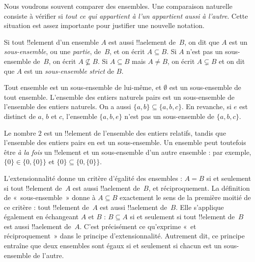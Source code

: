 \documentclass[../../../include/open-logic-section]{subfiles}
\begin{document}

\begin{explain}
Nous voudrons souvent comparer des ensembles. Une comparaison
naturelle consiste à vérifier si \emph{tout ce qui appartient à
l'un appartient aussi à l'autre}. Cette situation est assez
importante pour justifier une nouvelle notation.
\end{explain}

\begin{defn}
Si tout !!{element} d'un ensemble $A$ est aussi !!a{element} de~$B$,
on dit que $A$ est un \emph{sous-ensemble}, ou une \emph{partie},
de~$B$, et on écrit $A \subseteq B$. Si $A$ n'est pas un
sous-ensemble de~$B$, on écrit $A \not\subseteq B$.
Si $A \subseteq B$ mais $A \neq B$, on écrit $A \subsetneq B$
et on dit que $A$ est un \emph{sous-ensemble strict} de $B$.
\end{defn}

\begin{ex}
Tout ensemble est un sous-ensemble de lui-même, et $\emptyset$ est
un sous-ensemble de tout ensemble. L'ensemble des entiers naturels
pairs est un sous-ensemble de l'ensemble des entiers naturels.
On a aussi $\{ a, b \} \subseteq \{ a, b, c \}$. En revanche,
si $e$ est distinct de $a$, $b$ et $c$, l'ensemble $\{ a, b, e \}$
n'est pas un sous-ensemble de $\{ a, b, c \}$.
%
\end{ex}

\begin{ex}
Le nombre $2$ est un !!{element} de l'ensemble des entiers relatifs,
tandis que l'ensemble des entiers pairs en est un sous-ensemble.
Un ensemble peut toutefois être \emph{à la fois} un !!{element}
et un sous-ensemble d'un autre ensemble : par exemple,
$\{0\} \in \{0, \{0\}\}$ et $\{0\} \subseteq \{0, \{0\}\}$.
\end{ex}

L'extensionnalité donne un critère d'égalité des ensembles :
$A = B$ si et seulement si tout !!{element} de~$A$ est aussi
!!a{element} de~$B$, et réciproquement. La définition de
«~sous-ensemble~» donne à $A \subseteq B$ exactement le sens de
la première moitié de ce critère : tout !!{element} de~$A$ est
aussi !!a{element} de~$B$. Elle s'applique également en échangeant
$A$ et $B$ : $B \subseteq A$ si et seulement si tout !!{element}
de~$B$ est aussi !!a{element} de~$A$. C'est précisément ce
qu'exprime «~et réciproquement~» dans le principe d'extensionnalité.
Autrement dit, ce principe entraîne que deux ensembles sont égaux
si et seulement si chacun est un sous-ensemble de l'autre.
\end{document}
